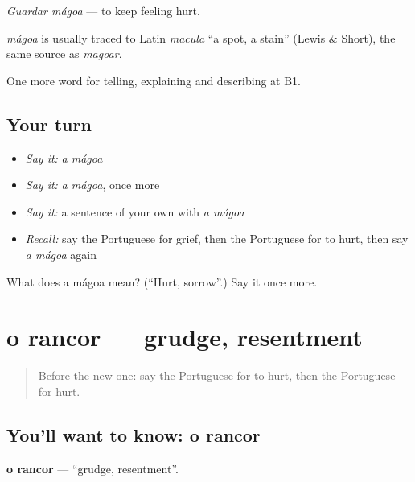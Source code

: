\emph{Guardar mágoa} — to keep feeling hurt.

\begin{cousinweb}
\emph{mágoa} is usually traced to Latin \emph{macula} \textquotedblleft{}a spot, a stain\textquotedblright{} (Lewis \& Short), the same source as \emph{magoar}.
\end{cousinweb}

\begin{grammarlens}[title={What you've built}]
One more word for telling, explaining and describing at B1.
\end{grammarlens}

\subsection*{Your turn}
\begin{itemize}
\raggedright
  \item \emph{Say it:} \emph{a mágoa}
  \item \emph{Say it:} \emph{a mágoa}, once more
  \item \emph{Say it:} a sentence of your own with \emph{a mágoa}
  \item \emph{Recall:} say the Portuguese for grief, then the Portuguese for to hurt, then say \emph{a mágoa} again
\end{itemize}

\begin{tcolorbox}[breakable,colback=teal!4,colframe=teal!35!black,title={Before you move on}]
What does a mágoa mean? (\textquotedblleft{}Hurt, sorrow\textquotedblright{}.) Say it once more.
\end{tcolorbox}
\section[o rancor]{o rancor — grudge, resentment}

\label{lesson:PT-C479-rancor}



\begin{quote}
Before the new one: say the Portuguese for to hurt, then the Portuguese for hurt.
\end{quote}

\subsection*{You'll want to know: o rancor}
\textbf{o rancor} — \textquotedblleft{}grudge, resentment\textquotedblright{}.

